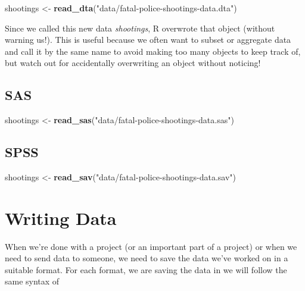 \documentclass[
  12pt,
]{book}
\newenvironment{Shaded}{\begin{snugshade}}{\end{snugshade}}
\newcommand{\KeywordTok}[1]{\textcolor[rgb]{0.27,0.27,0.27}{\textbf{#1}}}
\newcommand{\NormalTok}[1]{#1}
\newcommand{\StringTok}[1]{\textcolor[rgb]{0.5,0.5,0.5}{#1}}
\begin{document}
\begin{Shaded}
\begin{Highlighting}[]
\NormalTok{shootings <{-}}\StringTok{ }\KeywordTok{read\_dta}\NormalTok{(}\StringTok{"data/fatal{-}police{-}shootings{-}data.dta"}\NormalTok{)}
\end{Highlighting}
\end{Shaded}

Since we called this new data \emph{shootings}, R overwrote that object (without warning us!). This is useful because we often want to subset or aggregate data and call it by the same name to avoid making too many objects to keep track of, but watch out for accidentally overwriting an object without noticing!

\hypertarget{sas}{%
\subsection{SAS}\label{sas}}

\begin{Shaded}
\begin{Highlighting}[]
\NormalTok{shootings <{-}}\StringTok{ }\KeywordTok{read\_sas}\NormalTok{(}\StringTok{"data/fatal{-}police{-}shootings{-}data.sas"}\NormalTok{)}
\end{Highlighting}
\end{Shaded}

\hypertarget{spss}{%
\subsection{SPSS}\label{spss}}

\begin{Shaded}
\begin{Highlighting}[]
\NormalTok{shootings <{-}}\StringTok{ }\KeywordTok{read\_sav}\NormalTok{(}\StringTok{"data/fatal{-}police{-}shootings{-}data.sav"}\NormalTok{)}
\end{Highlighting}
\end{Shaded}

\hypertarget{writing-data}{%
\section{Writing Data}\label{writing-data}}

When we're done with a project (or an important part of a project) or when we need to send data to someone, we need to save the data we've worked on in a suitable format. For each format, we are saving the data in we will follow the same syntax of
\end{document}
